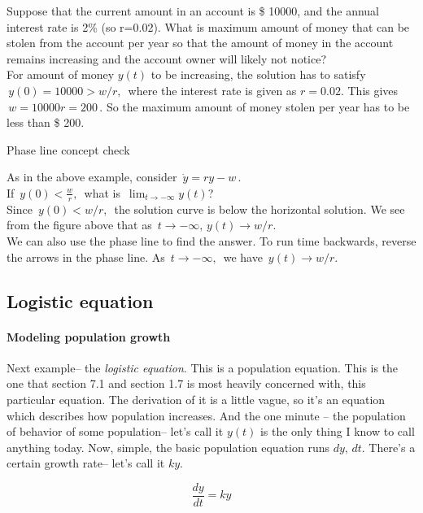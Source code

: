 Suppose that the current amount in an account is \$ 10000,
and the annual interest rate is 2\% (so r=0.02).
What is maximum amount of money that can be stolen from the account per year so that the amount of money in the account remains increasing and the account owner will likely not notice? \\

For amount of money $y(t)$ to be increasing,
the solution has to satisfy $\, y(0) = 10000 > w/r, \,$
where the interest rate is given as $r = 0.02$.
This gives $\, w = 10000r =200\,$.
So the maximum amount of money stolen per year has to be less than \$ 200.

\begin{exercise}
  Phase line concept check
\end{exercise}

As in the above example, consider $\, \dot y = ry - w\,$. \\
If $\, y(0) < \frac{w}{r},\,$ what is $\, \lim_{t \to - \infty} y(t)$? \\

Since $\, y(0) < w/r, \,$ the solution curve is below the horizontal solution.
We see from the figure above that as $\, t \to −\infty,\, y(t) \to w/r$.\\
We can also use the phase line to find the answer.
To run time backwards, reverse the arrows in the phase line.
As $\, t \to − \infty,\,$ we have $\, y(t) \to w/r$.

\clearpage

\subsection{Logistic equation}

\paragraph{Modeling population growth}
Next example-- the \emph{logistic equation}.
This is a population equation.
This is the one that section 7.1 and section 1.7
is most heavily concerned with, this particular equation.
The derivation of it is a little vague,
so it's an equation which describes how population increases.
And the one minute -- the population of behavior of some
population-- let's call it $y(t)$ is the only thing I know to call
anything today.
Now, simple, the basic population equation
runs $dy,\, dt$. There's a certain growth rate--
let's call it $ky$.

\begin{equation*}
  \frac{dy}{dt} = ky 
\end{equation*}

